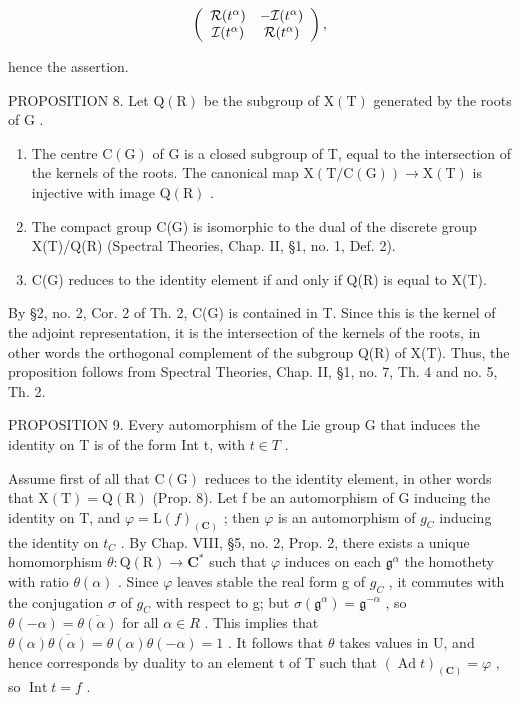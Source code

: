 \[
\left( \begin{array}{c c} \mathcal {R} (t ^ {\alpha}) & - \mathcal {I} (t ^ {\alpha}) \\ \mathcal {I} (t ^ {\alpha}) & \mathcal {R} (t ^ {\alpha}) \end{array} \right),
\]

hence the assertion.

PROPOSITION 8. Let \(\mathrm{Q}(\mathrm{R})\) be the subgroup of \(\mathrm{X}(\mathrm{T})\) generated by the roots of \(\mathrm{G}\) .

\begin{enumerate}
\def\labelenumi{\alph{enumi})}
\item
  The centre \(\mathrm{C}(\mathrm{G})\) of G is a closed subgroup of T, equal to the intersection of the kernels of the roots. The canonical map \(\mathrm{X}(\mathrm{T}/\mathrm{C}(\mathrm{G})) \to \mathrm{X}(\mathrm{T})\) is injective with image \(\mathrm{Q}(\mathrm{R})\) .
\item
  The compact group C(G) is isomorphic to the dual of the discrete group X(T)/Q(R) (Spectral Theories, Chap. II, §1, no. 1, Def. 2).
\item
  C(G) reduces to the identity element if and only if Q(R) is equal to X(T).
\end{enumerate}

By §2, no. 2, Cor. 2 of Th. 2, C(G) is contained in T. Since this is the kernel of the adjoint representation, it is the intersection of the kernels of the roots, in other words the orthogonal complement of the subgroup Q(R) of X(T). Thus, the proposition follows from Spectral Theories, Chap. II, §1, no. 7, Th. 4 and no. 5, Th. 2.

PROPOSITION 9. Every automorphism of the Lie group G that induces the identity on T is of the form Int t, with \(t \in T\) .

Assume first of all that \(\mathrm{C}(\mathrm{G})\) reduces to the identity element, in other words that \(\mathrm{X}(\mathrm{T}) = \mathrm{Q}(\mathrm{R})\) (Prop. 8). Let f be an automorphism of G inducing the identity on T, and \(\varphi = \mathrm{L}(f)_{(\mathbf{C})}\) ; then \(\varphi\) is an automorphism of \(g_{C}\) inducing the identity on \(t_{C}\) . By Chap. VIII, §5, no. 2, Prop. 2, there exists a unique homomorphism \(\theta : \mathrm{Q}(\mathrm{R}) \to \mathbf{C}^{*}\) such that \(\varphi\) induces on each \(\mathfrak{g}^{\alpha}\) the homothety with ratio \(\theta(\alpha)\) . Since \(\varphi\) leaves stable the real form g of \(g_{C}\) , it commutes with the conjugation \(\sigma\) of \(g_{C}\) with respect to g; but \(\sigma(\mathfrak{g}^{\alpha}) = \mathfrak{g}^{-\alpha}\) , so \(\theta(-\alpha) = \overline{\theta(\alpha)}\) for all \(\alpha \in R\) . This implies that \(\theta(\alpha)\overline{\theta(\alpha)} = \theta(\alpha)\theta(-\alpha) = 1\) . It follows that \(\theta\) takes values in U, and hence corresponds by duality to an element t of T such that \((\operatorname{Ad} t)_{(\mathbf{C})} = \varphi\) , so \(\operatorname{Int} t = f\) .

